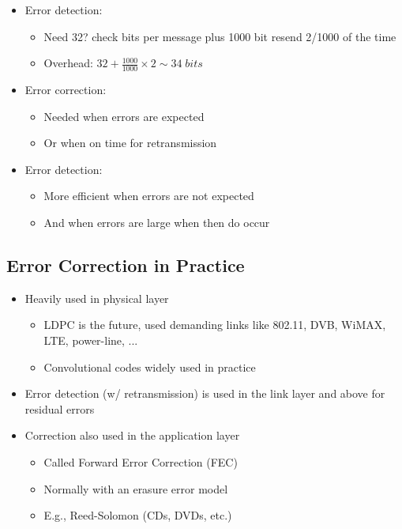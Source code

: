 \documentclass[12pt]{ctexart}   %
\begin{document}
\begin{itemize}
		\item Error detection:
		\begin{itemize}
			\item Need 32? check bits per message plus 1000 bit resend 2/1000 of the time
			\item Overhead: $ 32 + \frac{1000}{1000} \times 2 \sim 34 \; bits $
		\end{itemize}
		
		\item Error correction:
		\begin{itemize}
			\item Needed when errors are expected
			\item Or when on time for retransmission
		\end{itemize}
		
		\item Error detection:
		\begin{itemize}
			\item More efficient when errors are not expected
			\item And when errors are large when then do occur
		\end{itemize}
	\end{itemize}
	
	\subsection{Error Correction in Practice}
	\begin{itemize}
		\item Heavily used in physical layer
		\begin{itemize}
			\item LDPC is the future, used demanding links like 802.11, DVB, WiMAX, LTE, power-line, ...
			\item Convolutional codes widely used in practice
		\end{itemize}
		
		\item Error detection (w/ retransmission) is used in the link layer and above for residual errors
		
		\item Correction also used in the application layer
		\begin{itemize}
			\item Called Forward Error Correction (FEC)
			\item Normally with an erasure error model
			\item E.g., Reed-Solomon (CDs, DVDs, etc.)
		\end{itemize}
	\end{itemize}
	
\end{document}

